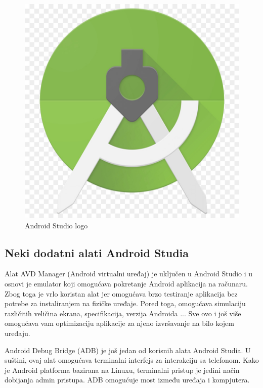 \documentclass[12pt]{article}
\begin{document}
\begin{figure}[ht!]
    \centering
    \includegraphics[scale=0.05]{android_studio_logo.jpg}
    \caption{Android Studio logo}
\end{figure}
\subsection{Neki dodatni alati Android Studia}
Alat AVD Manager (Android virtualni uređaj) je uključen u Android Studio i u osnovi je emulator koji omogućava pokretanje Android aplikacija na računaru. Zbog toga je vrlo koristan alat jer omogućava brzo testiranje aplikacija bez potrebe za instaliranjem na fizičke uređaje. Pored toga, omogućava simulaciju različitih veličina ekrana, specifikacija, verzija Androida ... Sve ovo i još više omogućava vam optimizaciju aplikacije za njeno izvršavanje na bilo kojem uređaju.

Android Debug Bridge (ADB) je još jedan od korisnih alata Android Studia. U suštini, ovaj alat omogućava terminalni interfejs za interakciju sa telefonom. Kako je Android platforma bazirana na Linuxu, terminalni pristup je jedini način dobijanja admin pristupa. ADB omogućuje most između uređaja i kompjutera.
\end{document}
